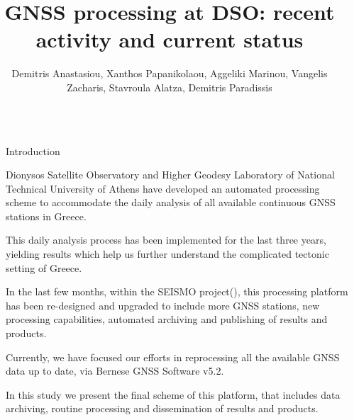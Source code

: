 \documentclass[final,a0,portrait]{beamer}
\title{GNSS processing at DSO: recent activity and current status} %
\author{Demitris Anastasiou, Xanthos Papanikolaou, Aggeliki Marinou, Vangelis Zacharis, Stavroula Alatza, Demitris Paradissis} %
\institute{National Technical University of Athens\\ \vspace{0.3em} \par{  School of Rural and Surveying Engineering, Dionysos Satellite Observatory}} %
\newlength{\sepwid}
\newlength{\onecolwid}
\begin{document}

\setlength{\belowcaptionskip}{2ex} %
\setlength\belowdisplayshortskip{2ex} %

\begin{frame}[t] %

\begin{columns}[t] %

\begin{column}{\sepwid}\end{column} %

\begin{column}{\onecolwid} %


\begin{block}{Introduction}
{\small
Dionysos Satellite Observatory and Higher Geodesy Laboratory of National Technical University of Athens
have developed an automated processing scheme to accommodate the daily analysis of all available continuous GNSS stations in Greece.

This daily analysis process has been implemented for the last three years,
yielding results which help us further understand the complicated tectonic setting of Greece.

In the last few months, within the SEISMO project(\cite{dsoseismo}), 
this processing platform has been re-designed and upgraded to include more GNSS stations,
new processing capabilities, automated archiving and publishing of results and products.

Currently, we have focused our efforts in reprocessing all the available GNSS data up to date, via Bernese GNSS Software v5.2\cite{bernese}.

In this study we present the final scheme of this platform, that includes data archiving, routine processing and dissemination of results and products.

}
\end{block}
\end{column}
\end{columns}
\end{frame}
\end{document}
